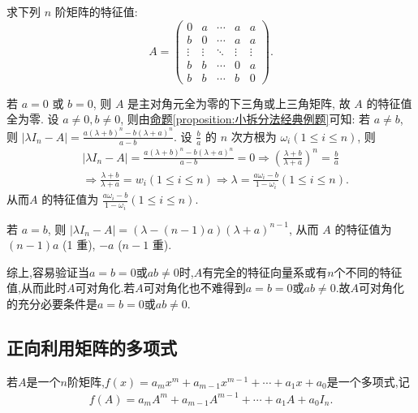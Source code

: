 \documentclass[../../main.tex]{subfiles}%
\begin{document}
\begin{example}
求下列 $n$ 阶矩阵的特征值:
\[
A = \begin{pmatrix}
0 & a & \cdots & a & a \\
b & 0 & \cdots & a & a \\
\vdots & \vdots & \ddots & \vdots & \vdots \\
b & b & \cdots & 0 & a \\
b & b & \cdots & b & 0
\end{pmatrix}.
\]
\end{example}
\begin{solution}
若 $a = 0$ 或 $b = 0$, 则 $A$ 是主对角元全为零的下三角或上三角矩阵, 故 $A$ 的特征值全为零. 设 $a \neq 0, b \neq 0$, 则由\hyperref[proposition:小拆分法经典例题]{命题\ref{proposition:小拆分法经典例题}}可知:
若 $a \neq b$, 则 $|\lambda I_n-A|=\frac{a(\lambda +b)^n-b(\lambda +a)^n}{a-b}$. 设 $\frac{b}{a}$ 的 $n$ 次方根为 $\omega_i (1 \leqslant  i \leqslant  n)$, 则
\begin{align*}
&|\lambda I_n-A|=\frac{a(\lambda +b)^n-b(\lambda +a)^n}{a-b}=0\Rightarrow \left( \frac{\lambda +b}{\lambda +a} \right) ^n=\frac{b}{a}
\\
&\Rightarrow \frac{\lambda +b}{\lambda +a}=w_i\left( 1\leqslant i\leqslant n \right) \Rightarrow \lambda =\frac{a\omega _i-b}{1-\omega _i}(1\leqslant i\leqslant n).
\end{align*}
从而$A$ 的特征值为 $\frac{a \omega_i - b}{1 - \omega_i} (1 \leqslant  i \leqslant  n)$.

若 $a = b$, 则 $|\lambda I_n - A| = (\lambda - (n - 1)a)(\lambda + a)^{n-1}$, 从而 $A$ 的特征值为 $(n - 1)a$ (1 重), $-a$ ($n - 1$ 重).

综上,容易验证当$a=b=0$或$ab\ne0$时,$A$有完全的特征向量系或有$n$个不同的特征值,从而此时$A$可对角化.若$A$可对角化也不难得到$a=b=0$或$ab\ne0$.故$A$可对角化的充分必要条件是$a=b=0$或$ab\ne0$.

\end{solution}

\subsection{正向利用矩阵的多项式}

\begin{definition}[矩阵多项式]
若$A$是一个$n$阶矩阵,$f(x) = a_m x^m + a_{m-1} x^{m-1} + \cdots + a_1 x + a_0$是一个多项式,记
\begin{align*}
f(A) = a_m A^m + a_{m-1} A^{m-1} + \cdots + a_1 A + a_0 I_n.
\end{align*}
\end{definition}
\end{document}

